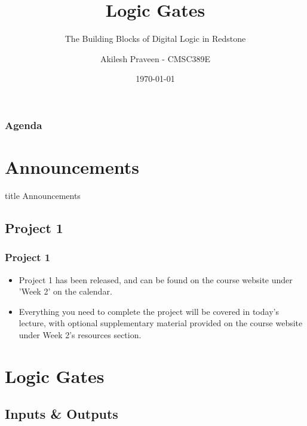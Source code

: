\documentclass{beamer}
\title{Logic Gates}
\subtitle{The Building Blocks of Digital Logic in Redstone}
\author[A Praveen]{Akilesh Praveen - CMSC389E}
\institute{UMD}
\date{\today}
\begin{document}
    \begin{frame}
        \titlepage
    \end{frame}
    
    \begin{frame}
        \frametitle{Agenda}
        \tableofcontents
    \end{frame}
    
    \section{Announcements}
    
        \begin{frame}
                \vfill
                \centering
                \begin{beamercolorbox}[sep=8pt,center,shadow=true,rounded=true]{title}
                    Announcements\par%
                \end{beamercolorbox}
                \vfill
             \end{frame}
    
        \subsection{Project 1}
        
            
            
            \begin{frame}
                \frametitle{Project 1}
                \begin{itemize}
                    \item Project 1 has been released, and can be found on the course website under 'Week 2' on the calendar.
                    \item Everything you need to complete the project will be covered in today's lecture, with optional supplementary material provided on the course website under Week 2's resources section.
                \end{itemize}
            \end{frame}
        
            
    \section{Logic Gates}
        \subsection{Inputs \& Outputs}
        
\end{document}
